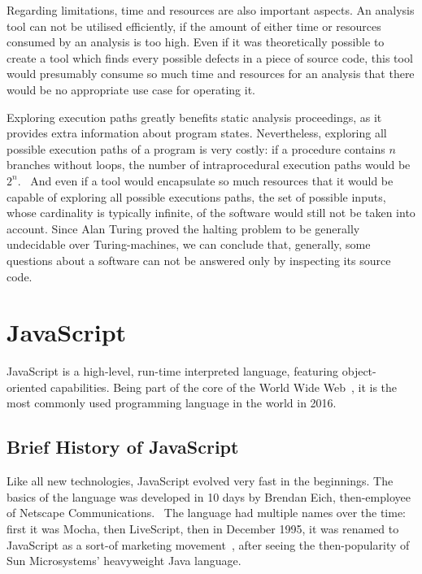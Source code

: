 Regarding limitations, time and resources are also important aspects. An analysis tool can not be utilised efficiently, if the amount of either time or resources consumed by an analysis is too high. Even if it was theoretically possible to create a tool which finds every possible defects in a piece of source code, this tool would presumably consume so much time and resources for an analysis that there would be no appropriate use case for operating it.~\cite{anderson2008use}

Exploring execution paths greatly benefits static analysis proceedings, as it provides extra information about program states. Nevertheless, exploring all possible execution paths of a program is very costly: if a procedure contains $n$ branches without loops, the number of intraprocedural execution paths would be $2^n$.~\cite{anderson2008use} And even if a tool would encapsulate so much resources that it would be capable of exploring all possible executions paths, the set of possible inputs, whose cardinality is typically infinite, of the software would still not be taken into account. Since Alan Turing proved the halting problem to be generally undecidable over Turing-machines, we can conclude that, generally, some questions about a software can not be answered only by inspecting its source code.


\section{JavaScript}

JavaScript is a high-level, run-time interpreted language, featuring object-oriented capabilities. Being part of the core of the World Wide Web~\cite{flanagan2006javascript}, it is the most commonly used programming language in the world in 2016.~\cite{javascriptstackoverflow}


\subsection{Brief History of JavaScript}

Like all new technologies, JavaScript evolved very fast in the beginnings. The basics of the language was developed in 10 days by Brendan Eich, then-employee of Netscape Communications.~\cite{10.1109/MC.2012.57} The language had multiple names over the time: first it was Mocha, then LiveScript, then in December 1995, it was renamed to JavaScript as a sort-of marketing movement~\cite{webedjavascripthistory}, after seeing the then-popularity of Sun Microsystems' heavyweight Java language.

